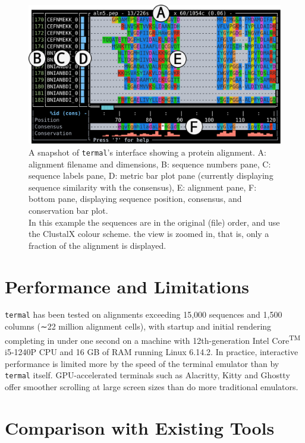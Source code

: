 \documentclass[11pt]{article}
\begin{document}
\begin{figure}[htbp]
\centering
	\includegraphics[width=\textwidth]{figure-1.pdf}
\caption{%
	A snapshot of \texttt{termal}'s interface showing a protein alignment. A:
	alignment filename and dimensions, B: sequence numbers pane, C: sequence
	labels pane, D: metric bar plot pane (currently displaying sequence similarity
	with the consensus), E: alignment pane, F: bottom pane, displaying sequence
	position, consensus, and conservation bar plot. \\
	In this example the sequences are in the original (file) order, and use the
	ClustalX colour
scheme. the view is zoomed in, that is, only a fraction of the
	alignment is displayed. }
	\label{fig:screen}
\end{figure}


\section*{Performance and Limitations}

\texttt{termal} has been tested on alignments exceeding 15,000 sequences and
1,500 columns (∼22 million alignment cells), with startup and initial rendering
completing in under one second on a machine with 12th-generation
Intel\textregistered{} Core\textsuperscript{TM} i5-1240P CPU and 16 GB of RAM
running Linux 6.14.2. In practice, interactive performance is limited more by
the speed of the terminal emulator than by \texttt{termal} itself.
GPU-accelerated terminals such as Alacritty\cite{alacritty}, Kitty\cite{kitty}
and Ghostty\cite{ghostty} offer smoother scrolling at large screen sizes than do
more traditional emulators.


\section*{Comparison with Existing Tools}
\end{document}
